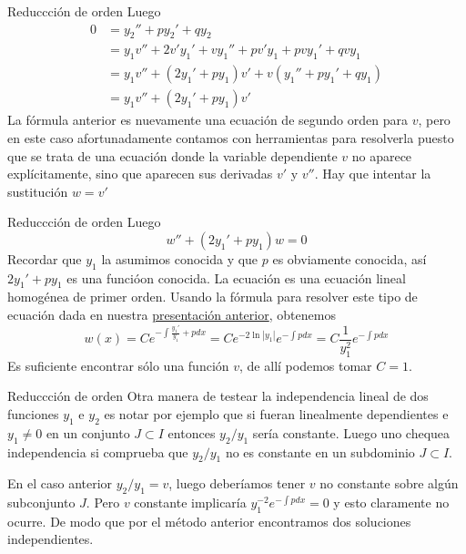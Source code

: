 \documentclass[handout,hyperref={colorlinks=true}]{beamer}
\newcommand{\nl}{\onslide<+-> }
\begin{document}
\begin{frame}{Reduccción de orden}
Luego
\[
 \begin{split}
    0&=y_2''+py_2'+qy_2\\
    &=y_1v''+2v'y_1'+vy_1''+pv'y_1+pvy_1'+qvy_1\\
    &=y_1 v''+(2y_1'+py_1)v'+v(y_1''+py_1'+qy_1)\\
    &=y_1 v''+(2y_1'+py_1)v'
 \end{split}
\]
La fórmula anterior es nuevamente una ecuación de segundo orden para $v$, 
pero en este caso afortunadamente contamos con herramientas para resolverla puesto que se trata de una ecuación donde la 
variable dependiente $v$ no aparece explícitamente, sino que aparecen sus derivadas $v'$ y $v''$. Hay que intentar la sustitución $w=v'$


\end{frame}
 
 
\begin{frame}{Reduccción de orden}
Luego
\[
 w''+(2y_1'+py_1)w=0
\]
Recordar que $y_1$ la asumimos conocida y que $p$ es obviamente conocida, así $2y_1'+py_1$ es una funcióon conocida. La ecuación es una ecuación lineal homogénea de primer orden. 
Usando la fórmula para resolver este tipo de ecuación dada en nuestra 
\href{https://github.com/fdmazzone/Material-Ecuaciones-Diferenciales/blob/master/uni2.pdf?raw=true}{presentación anterior}, obtenemos
\[w(x)=Ce^{-\int \frac{y_1'}{y_1}+p dx}=Ce^{-2\ln|y_1|}e^{-\int p dx}=C\frac{1}{y_1^2}e^{-\int p dx} \]
Es suficiente encontrar sólo una función $v$, de allí podemos tomar $C=1$. 



\end{frame} 

\begin{frame}{Reduccción de orden}
\nl Otra manera de testear la independencia lineal de dos funciones $y_1$ e $y_2$ es notar por ejemplo que si fueran linealmente dependientes e $y_1\neq 0$ 
en un conjunto $J\subset I$ entonces $y_2/y_1$
sería constante.  
\nl Luego uno chequea independencia si comprueba que $y_2/y_1$ no es constante en un subdominio $J\subset I$. 

\nl En el caso anterior $y_2/y_1=v$, luego 
deberíamos tener $v$ no constante sobre algún subconjunto $J$. Pero $v$ constante implicaría $y_1^{-2}e^{-\int pdx}=0$ y esto claramente no ocurre. De modo que por el
método anterior encontramos dos soluciones independientes.   





\end{frame} 
\end{document}
